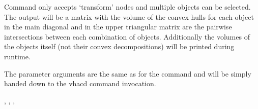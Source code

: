\documentclass[letterpaper,10pt,english]{sphinxmanual}
\begin{document}
Command only accepts ‘transform’ nodes and multiple objects can be selected. The output will be a matrix with the volume of the convex hulls for each object in the main diagonal and in the upper triangular matrix are the pairwise intersections between each combination of objects. Additionally the volumes of the objects itself (not their convex decompositions) will be printed during runtime.

The parameter arguments are the same as for the command {\hyperref[\detokenize{pk_src.vhacd:vhacd}]{}} and will be simply handed down to the vhacd command invocation.

 {\hyperref[\detokenize{pk_src.collision_tet_tet:collision-tet-tet}]{}}, {\hyperref[\detokenize{pk_src.intersection_tet_tet:intersection-tet-tet}]{}}, {\hyperref[\detokenize{pk_src.getVolume:getvolume}]{}}, {\hyperref[\detokenize{pk_src.vhacd:vhacd}]{}}
\end{document}
